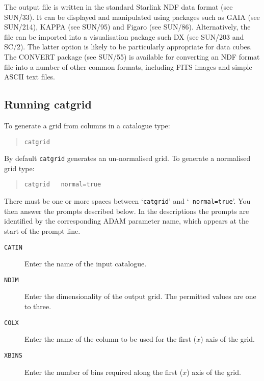 \documentclass[twoside,11pt]{article}
\newcommand{\xref}[3]{#1}
\renewcommand{\_}{\texttt{\symbol{95}}}
\begin{document}
The output file is written in the standard Starlink NDF data format
(see \xref{SUN/33}{sun33}{}\cite{SUN33}).  It can be displayed and
manipulated using packages such as
GAIA (see \xref{SUN/214}{sun214}{}\cite{SUN214}),
KAPPA (see \xref{SUN/95}{sun95}{}\cite{SUN95}) and
Figaro (see \xref{SUN/86}{sun86}{}\cite{SUN86}).  Alternatively, the file
can be imported into a visualisation package such DX (see
\xref{SUN/203}{sun203}{}\cite{SUN203} and \xref{SC/2}{sc2}{}\cite{SC2}).
The latter option is likely to be particularly appropriate for data
cubes.  The CONVERT package (see \xref{SUN/55}{sun55}{}\cite{SUN55})
is available for converting an NDF format file into a number of other
common formats, including FITS images and simple ASCII text files.

\subsection{Running catgrid}

To generate a grid from columns in a catalogue type:

\begin{verse}
{\tt catgrid}
\end{verse}

By default {\tt catgrid} generates an un-normalised grid.  To generate
a normalised grid type:

\begin{verse}
{\tt catgrid ~ normal=true}
\end{verse}

There must be one or more spaces between `{\tt catgrid}' and `{\tt
normal=true}'.  You then answer the prompts described below.  In the
descriptions the prompts are identified by the corresponding ADAM
parameter name, which appears at the start of the prompt line.

\begin{description}

  \item[ {\tt CATIN} ] Enter the name of the input catalogue.

  \item[ {\tt NDIM} ] Enter the dimensionality of the output grid.  The
   permitted values are one to three.

  \item[ {\tt COLX} ] Enter the name of the column to be used for the
   first ($x$\/) axis of the grid.

  \item[ {\tt XBINS} ] Enter the number of bins required along the first
   ($x$\/) axis of the grid.

\end{description}
\end{document}
